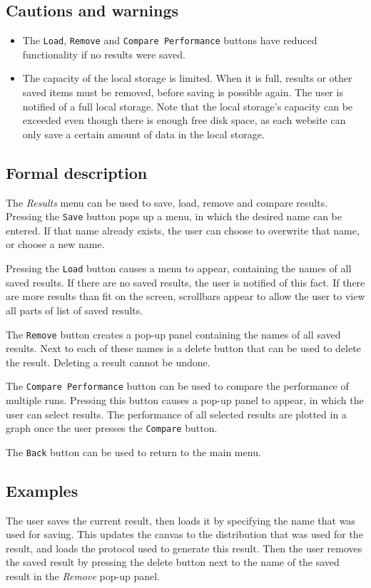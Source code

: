   \subsection*{Cautions and warnings}
  \begin{itemize}
    \item The \texttt{Load}, \texttt{Remove} and \texttt{Compare Performance} buttons have reduced functionality if no results were saved.
    \item The capacity of the local storage is limited. When it is full, results or other saved \projectname{} items must be removed, before saving is possible again. The user is notified of a full local storage. Note that the local storage's capacity can be exceeded even though there is enough free disk space, as each website can only save a certain amount of data in the local storage.
  \end{itemize}  

  \subsection*{Formal description}
  The \emph{Results} menu can be used to save, load, remove and compare results. Pressing the \texttt{Save} button pops up a menu, in which the desired name can be entered. If that name already exists, the user can choose to overwrite that name, or choose a new name.
  
  Pressing the \texttt{Load} button causes a menu to appear, containing the names of all saved results. If there are no saved results, the user is notified of this fact. If there are more results than fit on the screen, scrollbars appear to allow the user to view all parts of list of saved results.
  
  The \texttt{Remove} button creates a pop-up panel containing the names of all saved results. Next to each of these names is a delete button that can be used to delete the result. Deleting a result cannot be undone. 
  
  The \texttt{Compare Performance} button can be used to compare the performance of multiple runs. Pressing this button causes a pop-up panel to appear, in which the user can select results. The performance of all selected results are plotted in a graph once the user presses the \texttt{Compare} button.
  
  The \texttt{Back} button can be used to return to the main menu.
  
  \subsection*{Examples}
  The user saves the current result, then loads it by specifying the name that was used for saving. This updates the canvas to the distribution that was used for the result, and loads the protocol used to generate this result. Then the user removes the saved result by pressing the delete button next to the name of the saved result in the \emph{Remove} pop-up panel.

